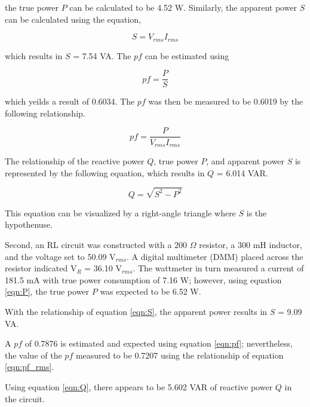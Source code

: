 \documentclass[12pt]{article}
\newcommand{\rms}{\ensuremath{_{rms}}}
\begin{document}
the true power $P$ can be calculated to be 4.52 W. Similarly, the apparent power $S$ can be calculated using the equation,

\begin{equation}
	S = {V_{rms}}{I_{rms}}
	\label{eqn:S} 
\end{equation}

which results in $S$ = 7.54 VA. The $pf$ can be estimated using 

\begin{equation}
	pf = \frac{P}{S}
	\label{eqn:pf}
\end{equation}

which yeilds a result of 0.6034. The $pf$ was then be measured to be 0.6019 by the following relationship.

\begin{equation}
	pf = \frac{P}{V\rms I\rms}
	\label{eqn:pf_rms}
\end{equation}

The relationship of the reactive power $Q$, true power $P$, and apparent power $S$ is represented by the following equation, which results in $Q$ = 6.014 VAR.

\begin{equation}
	Q = \sqrt{S^2 - P^2}
	\label{eqn:Q}
\end{equation}

This equation can be visualized by a right-angle triangle where $S$ is the hypothenuse.

Second, an RL circuit was constructed with a 200 $\Omega$ resistor, a 300 mH inductor, and the voltage set to 50.09 V\rms. A digital multimeter (DMM) placed across the resistor indicated V$_R$ = 36.10 V\rms. The wattmeter in turn measured a current of 181.5 mA with true power consumption of 7.16 W; however, using equation \ref{eqn:P}, the true power $P$ was expected to be 6.52 W. 

With the relationship of equation \ref{eqn:S}, the apparent power results in $S$ = 9.09 VA.

A $pf$ of 0.7876 is estimated and expected using equation \ref{eqn:pf}; nevertheless, the value of the $pf$ measured to be 0.7207 using the relationship of equation \ref{eqn:pf_rms}.

Using equation \ref{eqn:Q}, there appears to be 5.602 VAR of reactive power $Q$ in the circuit.
\end{document}
